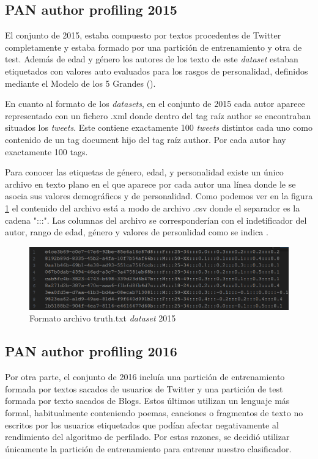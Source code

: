   \subsection{PAN author profiling 2015}
  \label{subsec:pan15}
 El conjunto de 2015, estaba compuesto por textos procedentes de Twitter completamente y estaba formado por una partición de entrenamiento y otra de test. Además de edad y género los autores de los texto de este \textit{dataset} estaban etiquetados con valores auto evaluados para los rasgos de personalidad, definidos mediante el Modelo de los 5 Grandes (\cite{5grandes}).

 En cuanto al formato de los \textit{datasets}, en el conjunto de 2015 cada autor aparece representado con un fichero .xml donde dentro del tag raíz author se encontraban situados los \textit{tweets}. Este contiene exactamente 100 \textit{tweets} distintos cada uno como contenido de un tag document hijo del tag raíz author. Por cada autor hay exactamente 100 tags.
 
 Para conocer las etiquetas de género, edad, y personalidad existe un único archivo en texto plano en el que aparece por cada autor una línea donde le se asocia sus valores demográficos y de personalidad. Como podemos ver en la figura \ref{fig:formato-dataset} el contenido del archivo está a modo de archivo .csv donde el separador es la cadena ":::". Las columnas del archivo se corresponderían con el indetificador del autor, rango de edad, género y valores de personlidad como se indica \cite{dataset:15}.
 \begin{figure}[hp!]
  \centering
    \includegraphics[width=\textwidth]{imaxes/formato_dataset.png}
  \caption{Formato archivo truth.txt \textit{dataset} 2015}
  \label{fig:formato-dataset}
\end{figure}

  \subsection{PAN author profiling 2016}
 Por otra parte, el conjunto de 2016 incluía una partición de entrenamiento formada por textos sacados de usuarios de Twitter y una partición de test formada por texto sacados de Blogs. Estos últimos utilizan un lenguaje más formal, habitualmente conteniendo poemas, canciones o fragmentos de texto no escritos por los usuarios etiquetados que podían afectar negativamente al rendimiento del algoritmo de perfilado. Por estas razones, se decidió utilizar únicamente la partición de entrenamiento para entrenar nuestro clasificador.
 
